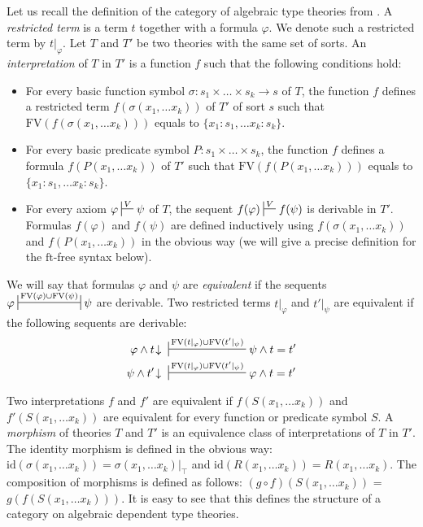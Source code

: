 \documentclass[reqno]{amsart}
\theoremstyle{definition}
\theoremstyle{remark}
\newcommand{\fs}[1]{\mathrm{#1}}
\newcommand{\FV}{\fs{FV}}
\newcommand{\ft}{\fs{ft}}
\newcommand{\id}{\fs{id}}
\numberwithin{figure}{section}
\begin{document}
Let us recall the definition of the category of algebraic type theories from \cite{alg-tt}.
A \emph{restricted term} is a term $t$ together with a formula $\varphi$.
We denote such a restricted term by $t|_\varphi$.
Let $T$ and $T'$ be two theories with the same set of sorts.
An \emph{interpretation} of $T$ in $T'$ is a function $f$ such that the following conditions hold:
\begin{itemize}
\item For every basic function symbol $\sigma : s_1 \times \ldots \times s_k \to s$ of $T$,
the function $f$ defines a restricted term $f(\sigma(x_1, \ldots x_k))$ of $T'$ of sort $s$ such that $\FV(f(\sigma(x_1, \ldots x_k)))$ equals to $\{ x_1 : s_1, \ldots x_k : s_k \}$.
\item For every basic predicate symbol $P : s_1 \times \ldots \times s_k$,
the function $f$ defines a formula $f(P(x_1, \ldots x_k))$ of $T'$ such that $\FV(f(P(x_1, \ldots x_k)))$ equals to $\{ x_1 : s_1, \ldots x_k : s_k \}$.
\item For every axiom $\varphi \sststile{}{V} \psi$ of $T$, the sequent $f(\varphi) \sststile{}{V} f(\psi)$ is derivable in $T'$.
Formulas $f(\varphi)$ and $f(\psi)$ are defined inductively using $f(\sigma(x_1, \ldots x_k))$ and $f(P(x_1, \ldots x_k))$ in the obvious way (we will give a precise definition for the $\ft$-free syntax below).
\end{itemize}

We will say that formulas $\varphi$ and $\psi$ are \emph{equivalent} if the sequents $\varphi \ssststile{}{\FV(\varphi) \cup \FV(\psi)} \psi$ are derivable.
Two restricted terms $t|_\varphi$ and $t'|_\psi$ are equivalent if the following sequents are derivable:
\begin{align*}
\varphi \land t\!\downarrow\ & \sststile{}{\FV(t|_\varphi) \cup \FV(t'|_\psi)} \psi \land t = t' \\
\psi \land t'\!\downarrow\ & \sststile{}{\FV(t|_\varphi) \cup \FV(t'|_\psi)} \varphi \land t = t'
\end{align*}

Two interpretations $f$ and $f'$ are equivalent if $f(S(x_1, \ldots x_k))$ and $f'(S(x_1, \ldots x_k))$ are equivalent for every function or predicate symbol $S$.
A \emph{morphism} of theories $T$ and $T'$ is an equivalence class of interpretations of $T$ in $T'$.
The identity morphism is defined in the obvious way: $\id(\sigma(x_1, \ldots x_k)) = \sigma(x_1, \ldots x_k)|_\top$ and $\id(R(x_1, \ldots x_k)) = R(x_1, \ldots x_k)$.
The composition of morphisms is defined as follows: $(g \circ f)(S(x_1, \ldots x_k))$ = $g(f(S(x_1, \ldots x_k)))$.
It is easy to see that this defines the structure of a category on algebraic dependent type theories.
\end{document}
